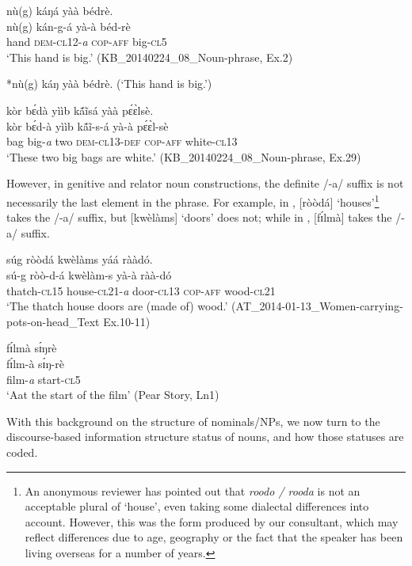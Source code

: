 \documentclass[output=paper]{langsci/langscibook}
\begin{document}
\ea\label{ex:teo:21}
\glll nù(g) káŋá yàà bédrè.\\
 nù(g) kán-g-á yà-à béd-rè\\
hand \textsc{dem-cl}12-\textit{a} \textsc{cop-aff} big-\textsc{cl}5 \\
\glt ‘This hand is big.’ (KB\_20140224\_08\_Noun-phrase, Ex.2)
\z

\ea\label{ex:teo:22}
*nù(g) káŋ yàà bédrè.
\glt (‘This hand is big.’)
\z

\ea\label{ex:teo:23}
\glll kòr b\'ɛdà yììb k\'ã\~{i}sá yàà p\'ɛ\`ɛlsè.\\
 kòr b\'ɛd-à yììb k\'ã\~{i}-s-á yà-à p\'ɛ\`ɛl-sè\\
bag big-\textit{a} two \textsc{dem}-\textsc{cl13-}\textsc{def} \textsc{cop-aff} white-\textsc{cl13}\\
\glt ‘These two big bags are white.’ (KB\_20140224\_08\_Noun-phrase, Ex.29)
\z

However, in genitive and relator noun constructions, the definite /-a/ suffix is not necessarily the last element in the phrase. For example, in , [ròòdá] ‘houses’\footnote{An anonymous reviewer has pointed out that \textit{roodo / rooda} is not an acceptable plural of ‘house’, even taking some dialectal differences into account. However, this was the form produced by our consultant, which may reflect differences due to age, geography or the fact that the speaker has been living overseas for a number of years.} takes the /-a/ suffix, but [kwèlàms] ‘doors’ does not; while in , [f\'ɪlmà] takes the /-a/ suffix.

\ea\label{ex:teo:24}
\glll súg ròòdá kwèlàms yáá rààdó.\\
 sú-g ròò-d-á kwèlàm-s yà-à ràà-dó\\
thatch-\textsc{cl15} house-\textsc{cl21-}\textit{a} door-\textsc{cl13} \textsc{cop-aff} wood-\textsc{cl21}\\
\glt ‘The thatch house doors are (made of) wood.’ (AT\_2014-01-13\_Women-carrying-pots-on-head\_Text Ex.10-11)
\z

\ea\label{ex:teo:25}
\glll f\'ɪlmà s\'ɪŋrè\\
 f\'ɪlm-à s\'ɪŋ-rè\\
film-\textit{a} start-\textsc{cl5}\\
\glt ‘Aat the start of the film’ (Pear Story, Ln1)
\z

With this background on the structure of  nominals/NPs, we now turn to the discourse-based information structure status of nouns, and how those statuses are coded.
\end{document}
